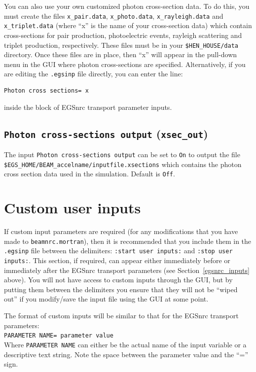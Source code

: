 \documentclass[12pt,twoside]{article}
\begin{document}
You can also use your own customized photon cross-section data.  To do this,
you must create the files {\tt x\_pair.data}, {\tt x\_photo.data}, {\tt x\_rayleigh.data} and
{\tt x\_triplet.data} (where ``x'' is the name of your cross-section data)
which contain cross-sections for  pair production, photoelectric events, rayleigh scattering and triplet production, respectively.  These files must be in
your {\tt \$HEN\_HOUSE/data} directory.  Once these files are in place, then
``x'' will appear in the pull-down menu in the GUI where photon
cross-sections are specified.  Alternatively, if you are editing the
{\tt .egsinp} file directly, you can enter the line:
\begin{verbatim}
Photon cross sections= x
\end{verbatim}
inside the block of EGSnrc transport parameter inputs.

\subsection{{\tt Photon cross-sections output} ({\tt xsec\_out})}

The input {\tt Photon cross-sections output} can be set to {\tt On} to
output the file\\
 {\tt \$EGS\_HOME/BEAM\_accelname/inputfile.xsections} which
contains the photon cross section data used in the simulation.  Default
is {\tt Off}.

\section{Custom user inputs}
\label{custom_inputs}

If custom input parameters are required (for any modifications that you have
made to {\tt beamnrc.mortran}), then it is recommended that you
include them in the {\tt .egsinp} file between the delimiters:
{\tt :start user inputs:} and {\tt :stop user inputs:}.
This section, if required,
can appear either immediately before or immediately after the EGSnrc
transport parameters
(see Section~\ref{egsnrc_inputs} above).  You will not have access to custom
inputs through the GUI, but by putting them between the
delimiters you
ensure that they will not be ``wiped out'' if you modify/save the input
file using the GUI at some point.

The format of custom inputs will be similar to that for the EGSnrc
transport parameters:\\
{\tt PARAMETER NAME= parameter value}\\
Where {\tt PARAMETER NAME} can either be the actual name of the
input variable or a descriptive text string.  Note the space
between the parameter value and the ``='' sign.
\end{document}
